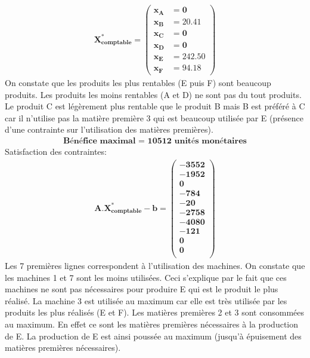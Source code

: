 \documentclass[12pt]{article}
\begin{document}
\begin{align*} 
	\boldsymbol{X^{*}_{comptable} = 
   \left (
   \begin{aligned}
      x_{A} &= 0 \\
      x_{B} &= 20.41 \\
      x_{C} &= 0 \\
      x_{D} &= 0 \\
      x_{E} &= 242.50 \\
      x_{F} &= 94.18 
   \end{aligned}
   \right )}
\end{align*}
On constate que les produits les plus rentables (E puis F) sont beaucoup produits. Les produits
les moins rentables (A et D) ne sont pas du tout produits. Le produit C est légèrement plus rentable que le produit B mais B est préféré à C car il n'utilise pas la matière première 3 qui est beaucoup utilisée par E (présence d'une contrainte sur l'utilisation des matières premières).
\begin{align*}
\textbf{Bénéfice maximal = 10512 unités monétaires}
\end{align*}
Satisfaction des contraintes: 
\begin{align*} 
	\boldsymbol{A.X^{*}_{comptable} - b = 	
   \left(
   \begin{aligned}    
      -3552 \\
      -1952 \\
      0 \\
      -784 \\
      -20 \\
      -2758 \\
      -4080 \\
      -121 \\
      0 \\
      0\\
   \end{aligned}
   \right )}
\end{align*}
Les 7 premières lignes correspondent à l'utilisation des machines. On constate que les
machines 1 et 7 sont les moins utilisées. Ceci s'explique par le fait que ces machines ne sont
pas nécessaires pour produire E qui est le produit le plus réalisé. La machine 3 est utilisée au maximum car elle est très utilisée par les produits les plus réalisés (E et F). Les matières premières 2 et 3 sont consommées au maximum. En effet ce sont les matières premières nécessaires à la production de E. La production de E est ainsi poussée au maximum (jusqu'à épuisement des matières premières nécessaires).
\end{document}
